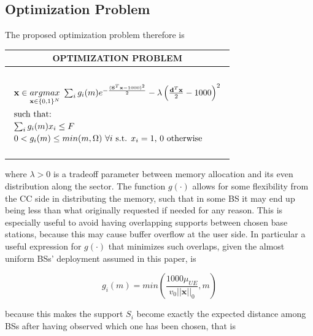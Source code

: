 \documentclass[conference,10pt]{IEEEtran}
\begin{document}
\subsection{Optimization Problem}

The proposed optimization problem therefore is

\begin{center}
	\begin{tabular}[h]{|c|}
		
		\hline
		OPTIMIZATION PROBLEM \\
		\hline
		\vbox{
			$$			
			\begin{array}{l l l l l l}
				\null \\
				\mathbf{x} \in \underset{\mathbf{x} \in \{0,1\}^N}{argmax} {\textrm{ } \sum_i{g_i(m)e^{-\frac{(\mathbf{S}^T\mathbf{x} - 1000)^2}{2}}} - \lambda\left(\frac{\mathbf{d}^T\mathbf{x}}{2} - 1000\right)^2} \\[3ex]
				\textrm{such that:}\\[0.5ex]	
				\sum_i{g_i(m)x_i} \le F\\[0.5ex]		
				0  < g_i(m) \le min(m, \Omega) \textrm{ } \forall i \textrm{ s.t. } x_i  = 1 \textrm{,   0 otherwise}
				\null \\[2ex]
			\end{array}
			$$
		}\\
		\hline
	\end{tabular}
\end{center}

where $\lambda > 0$ is a tradeoff parameter between memory allocation and its even distribution along the sector. The function $g(\cdot)$ allows for some flexibility from the CC side in distributing the memory, such that in some BS it may end up being less than what originally requested if needed for any reason. This is especially useful to avoid having overlapping supports between chosen base stations, because this may cause buffer overflow at the user side. In particular a useful expression for $g(\cdot)$ that minimizes such overlaps, given the almost uniform BSs' deployment assumed in this paper, is 

\begin{equation}
g_i(m) = min\left(\frac{1000\mu_{U\!E}}{v_0 ||\mathbf{x}||_0}, m\right)
\end{equation} 

because this makes the support $S_i$ become exactly the expected distance among BSs after having observed which one has been chosen, that is
\end{document}
